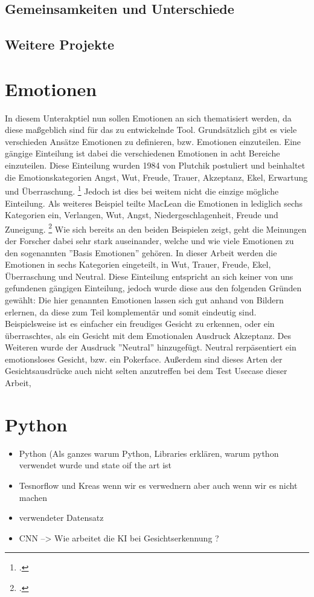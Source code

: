 \documentclass[12pt, a4paper]{scrbook}
\begin{document}
 
\subsection{Gemeinsamkeiten und Unterschiede}
\subsection{Weitere Projekte}
\section{Emotionen}
In diesem Unterakptiel nun sollen Emotionen an sich thematisiert werden, da diese maßgeblich sind für das zu entwickelnde Tool. Grundsätzlich gibt es viele verschieden Ansätze Emotionen zu definieren, bzw. Emotionen einzuteilen. Eine gängige Einteilung ist dabei die verschiedenen Emotionen in acht Bereiche einzuteilen. Diese Einteilung wurden 1984 von Plutchik postuliert und beinhaltet die Emotionskategorien Angst, Wut, Freude, Trauer, Akzeptanz, Ekel, Erwartung und Überraschung.
\footcite[Vgl. ][3]{FaceRec}
Jedoch ist dies bei weitem nicht die einzige mögliche Einteilung. Als weiteres Beispiel teilte MacLean  die Emotionen in lediglich sechs Kategorien ein, Verlangen, Wut, Angst, Niedergeschlagenheit, Freude und Zuneigung.
\footcite[Vgl. ][3]{FaceRec}
Wie sich bereits an den beiden Beispielen zeigt, geht die Meinungen der Forscher  dabei sehr stark auseinander, welche und wie viele Emotionen zu den sogenannten ''Basis Emotionen'' gehören. In dieser Arbeit werden die Emotionen in sechs Kategorien eingeteilt, in Wut, Trauer, Freude, Ekel, Überraschung und Neutral. Diese Einteilung entspricht an sich keiner von uns gefundenen gängigen Einteilung, jedoch wurde diese aus den folgenden Gründen gewählt:
Die hier genannten Emotionen lassen sich gut anhand von Bildern erlernen, da diese zum Teil komplementär und somit eindeutig sind. Beispielsweise ist es einfacher ein freudiges Gesicht zu erkennen, oder ein überraschtes, als ein Gesicht mit dem Emotionalen Ausdruck Akzeptanz. Des Weiteren wurde der Ausdruck ''Neutral'' hinzugefügt. Neutral rerpäsentiert ein emotionsloses Gesicht, bzw. ein Pokerface. Außerdem sind dieses Arten der Gesichtsausdrücke auch nicht selten anzutreffen bei dem Test Usecase dieser Arbeit,

\section{Python}
\begin{itemize}
\item Python (Als ganzes warum Python, Libraries erklären, warum python verwendet wurde und state oif the art ist
\item Tesnorflow und Kreas wenn wir es verwednern aber auch wenn wir es nicht machen
\item verwendeter Datensatz
\item CNN --> Wie arbeitet die KI bei Gesichtserkennung ?
\end{itemize}
\let\cleardoublepage\relax
\newpage
\end{document}
